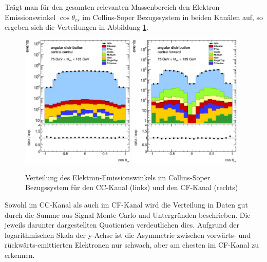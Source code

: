 Trägt man für den gesamten relevanten Massenbereich den
Elektron-Emissionswinkel $\cos\theta_{cs}$ im Collins-Soper Bezugssystem in
beiden Kanälen auf, so ergeben sich die Verteilungen in Abbildung
\ref{fig:cosTheta}.
\begin{figure}[h]
    \centering
    \includegraphics[width=0.48\textwidth]{plots/cosTheta_cc}
    \hfill
    \includegraphics[width=0.48\textwidth]{plots/cosTheta_cf}
    \caption[Verteilung des Elektron-Emissionswinkels im Collins-Soper
        Bezugssystem]
        {Verteilung des Elektron-Emissionswinkels im Collins-Soper
        Bezugssystem für den CC-Kanal (links) und den CF-Kanal (rechts)}
    \label{fig:cosTheta}
\end{figure}
Sowohl im CC-Kanal als auch im CF-Kanal wird die Verteilung in Daten gut durch
die Summe aus Signal Monte-Carlo und Untergründen beschrieben. Die jeweils
darunter dargestellten Quotienten verdeutlichen dies. Aufgrund der
logarithmischen Skala der y-Achse ist die Asymmetrie zwischen vorwärts- und
rückwärts-emittierten Elektronen nur schwach, aber am ehesten im CF-Kanal zu
erkennen.

